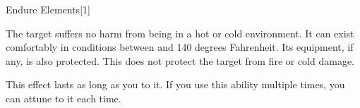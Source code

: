 \begin{spellsection}{Endure Elements}[1]

\begin{spellcontent}

\begin{spelltargetinginfo}



\end{spelltargetinginfo}


\begin{spelleffects}



\spelleffect
The target suffers no harm from being in a hot or cold environment.
It can exist comfortably in conditions between  and 140 degrees Fahrenheit.
Its equipment, if any, is also protected.
This does not protect the target from fire or cold damage.

This effect lasts as long as you  to it.
If you use this ability multiple times, you can attune to it each time.








\end{spelleffects}

\end{spellcontent}
\begin{spellfooter}


\end{spellfooter}
\begin{spellsubcontent}


\end{spellsubcontent}
\end{spellsection}


